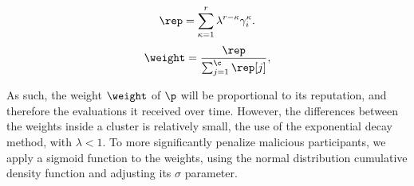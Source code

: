 \vspace{-1cm}
\begin{multicols}{2}
\begin{equation}\label{eq:reputation_history}
    \rep = \sum_{\kappa=1}^{r}\lambda^{r-\kappa}\gamma_i^{\kappa}.
\end{equation}\break
\begin{equation}\label{eq:weight_computation}
    \weight = \frac{\rep}{\sum_{j=1}^{\c}\rep[j]},
\end{equation}
\end{multicols}

As such, the weight $\weight$ of $\p$ will be proportional to its reputation, and therefore the evaluations it received over time.
However, the differences between the weights inside a cluster is relatively small, the use of the exponential decay method, with $\lambda < 1$.
To more significantly penalize malicious participants, we apply a sigmoid function to the weights, using the normal distribution cumulative density function and adjusting its $\sigma$ parameter.






